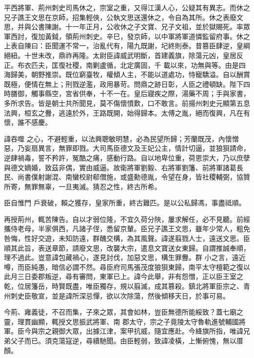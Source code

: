 \begin{pinyinscope}
 平西將軍、荊州刺史司馬休之，宗室之重，又得江漢人心，公疑其有異志。而休之
 兄子譙王文思在京師，招集輕俠，公執文思送還休之，令自為其所。休之表廢文思，并與公書陳謝。十一年正月，公收休之子文寶、兄子文祖，並於獄賜死。率眾軍西討，復加黃鉞，領荊州刺史。辛巳，發京師，以中軍將軍道憐監留府事。休之上表自陳曰：臣聞運不常一，治亂代有，陽九既謝，圮終則泰。昔篡臣肆逆，皇綱絕紐。十世未改，鼎祚再隆。太尉臣諱威武明斷，首建義旗，除蕩元凶，皇居反正。布衣匹夫，匡復社稷，南剿盧循，北定廣固，千
 載以來，功無與等。由是四海歸美，朝野推崇。既位窮臺牧，權傾人主，不能以道處功，恃寵驕溢。自以酬賞既極，便情在無上；刑戮逆濫，政用暴苛。問鼎之跡日彰，人臣之禮頓缺。陛下四時膳御，觸事縣空，宮省供奉，十不一在。皇后寢疾之際，湯藥不周；手與家書，多所求告。皆是朝士共所聞見，莫不傷懷憤歎，口不敢言。前揚州刺史元顯第五息法興，桓玄之釁，逃遠於外，王路既開，始得歸本。太傅之胤，絕而復興，凡在有懷，誰不感慶。



 諱吞噬
 之心，不避輕重，以法興聰敏明慧，必為民望所歸；芳蘭既茂，內懷憎惡，乃妄扇異言，無罪即戮。大司馬臣德文及王妃公主，情計切逼，並狼狽請命，逆肆禍毒，誓不矜許，冤酷之痛，感動行路。自以地卑位重，荷恩崇大，乃以庶孽與德文嫡婚，致茲非偶，實由威逼。故衛將軍劉毅、右將軍劉籓、前將軍諸葛長民、尚書僕射謝混、南蠻校尉郗僧施，或盛勳德胤，令望在身，皆社稷輔弼，協贊所寄，無罪無辜，一旦夷滅。猜忍之性，終古所希。



 臣自惟門
 戶衰破，賴之獲存，皇家所重，終古難匹。是以公私歸馮，事盡祗順。



 再授荊州，輒苦陳告。自以才弱位隆，不宜久荷分陜，屢求解任，必不見聽。前經攜侍老母，半家俱西，凡諸子侄，悉留京輦。臣兄子譙王文思，雖年少常人，粗免咎悔，性好交遊，未知防遠，群醜交構，為其風聲。諱遂翦戮人士，遠送文思。臣順其此旨，表送章節，請廢文思，改襲大宗，遣息文寶送女東歸。自謂推誠奉順，理不過此。豈意諱包藏禍心，遂見討伐，加惡文思，構生罪釁。群
 小之言，遠近噂，而臣純愚，暗信必謂不然。尋臣府司馬張茂度狼狽東歸，南平太守檀範之復以此月三日委郡叛逆，尋有審問，東軍已上。諱今此舉，非有怨憎，正以臣王室之乾，位居籓岳，時賢既盡，唯臣獨存，規以翦滅，成其篡殺。鎮北將軍臣宗之、青州刺史臣敬宣，並是諱所深忌憚，欲以次除蕩，然後傾移天日，於事可易。



 今荊、雍義徒，不召而集，子來之眾，其會如林，豈臣無德所能綏致？蓋七廟之靈，理貫幽顯，輒授文思振武將軍、南
 郡太守，宗之子竟陵太守魯軌進號輔國將軍。臣今與宗之親御大眾，出據江津，案甲抗威，隨宜應赴。今絳旗所指，唯諱兄弟父子而已。須克蕩寇逆，尋續馳聞。由臣輕弱，致諱凌橫，上慚俯愧，無以厝顏。




\end{pinyinscope}
